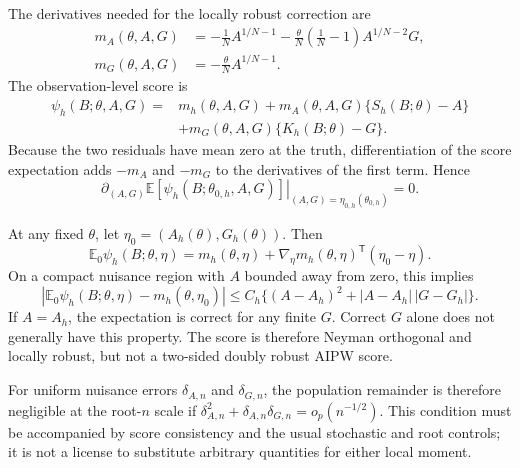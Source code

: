 The derivatives needed for the locally robust correction are
\begin{align}
m_A(\theta,A,G)
&=-\frac{1}{N}A^{1/N-1}
-\frac{\theta}{N}\left(\frac{1}{N}-1\right)A^{1/N-2}G,\\
m_G(\theta,A,G)&=-\frac{\theta}{N}A^{1/N-1}.
\end{align}
The observation-level score is
\begin{equation}
\begin{split}
\psi_h(B;\theta,A,G)
={}&m_h(\theta,A,G)
+m_A(\theta,A,G)\{S_h(B;\theta)-A\}\\
&+m_G(\theta,A,G)\{K_h(B;\theta)-G\}.
\end{split}
\label{eq:orthogonal-reserve-score}
\end{equation}
Because the two residuals have mean zero at the truth, differentiation of the
score expectation adds $-m_A$ and $-m_G$ to the derivatives of the first term.
Hence
\begin{equation}
\left.\partial_{(A,G)}
\mathbb E\left[\psi_h(B;\theta_{0,h},A,G)\right]
\right|_{(A,G)=\eta_{0,h}(\theta_{0,h})}=0.
\end{equation}

\begin{proposition}
\label{prop:orthogonal-remainder}
At any fixed $\theta$, let $\eta_0=(A_h(\theta),G_h(\theta))$. Then
\begin{equation}
\mathbb E_0\psi_h(B;\theta,\eta)
=m_h(\theta,\eta)+\nabla_\eta m_h(\theta,\eta)^{\mathsf T}(\eta_0-\eta).
\end{equation}
On a compact nuisance region with $A$ bounded away from zero, this implies
\begin{equation}
\left|\mathbb E_0\psi_h(B;\theta,\eta)-m_h(\theta,\eta_0)\right|
\leq C_h\{(A-A_h)^2+|A-A_h|\,|G-G_h|\}.
\label{eq:anisotropic-remainder}
\end{equation}
If $A=A_h$, the expectation is correct for any finite $G$. Correct $G$ alone
does not generally have this property. The score is therefore Neyman
orthogonal and locally robust, but not a two-sided doubly robust AIPW score.
\end{proposition}
For uniform nuisance errors $\delta_{A,n}$ and $\delta_{G,n}$, the population
remainder is therefore negligible at the root-$n$ scale if
$\delta_{A,n}^2+\delta_{A,n}\delta_{G,n}=o_p(n^{-1/2})$.
This condition must be accompanied by score consistency and the usual
stochastic and root controls; it is not a license to substitute arbitrary
quantities for either local moment.

